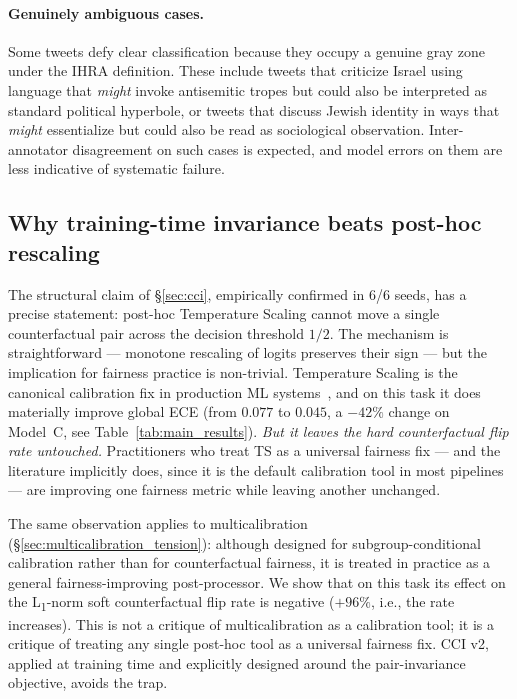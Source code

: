 \documentclass[10pt,a4paper]{article}
\begin{document}
\paragraph{Genuinely ambiguous cases.}
Some tweets defy clear classification because they occupy a genuine gray zone under the IHRA definition. These include tweets that criticize Israel using language that \emph{might} invoke antisemitic tropes but could also be interpreted as standard political hyperbole, or tweets that discuss Jewish identity in ways that \emph{might} essentialize but could also be read as sociological observation. Inter-annotator disagreement on such cases is expected, and model errors on them are less indicative of systematic failure.

\subsection{Why training-time invariance beats post-hoc rescaling}
\label{sec:disc_training_time}

The structural claim of \S\ref{sec:cci}, empirically confirmed in 6/6 seeds, has a precise statement: post-hoc Temperature Scaling cannot move a single counterfactual pair across the decision threshold $1/2$. The mechanism is straightforward --- monotone rescaling of logits preserves their sign --- but the implication for fairness practice is non-trivial. Temperature Scaling is the canonical calibration fix in production ML systems~\citep{guo2017calibration}, and on this task it does materially improve global ECE (from $0.077$ to $0.045$, a $-42\%$ change on Model~C, see Table~\ref{tab:main_results}). \emph{But it leaves the hard counterfactual flip rate untouched.} Practitioners who treat TS as a universal fairness fix --- and the literature implicitly does, since it is the default calibration tool in most pipelines --- are improving one fairness metric while leaving another unchanged.

The same observation applies to multicalibration (\S\ref{sec:multicalibration_tension}): although designed for subgroup-conditional calibration rather than for counterfactual fairness, it is treated in practice as a general fairness-improving post-processor. We show that on this task its effect on the L\textsubscript{1}-norm soft counterfactual flip rate is negative ($+96\%$, i.e., the rate increases). This is not a critique of multicalibration as a calibration tool; it is a critique of treating any single post-hoc tool as a universal fairness fix. CCI v2, applied at training time and explicitly designed around the pair-invariance objective, avoids the trap.
\end{document}
